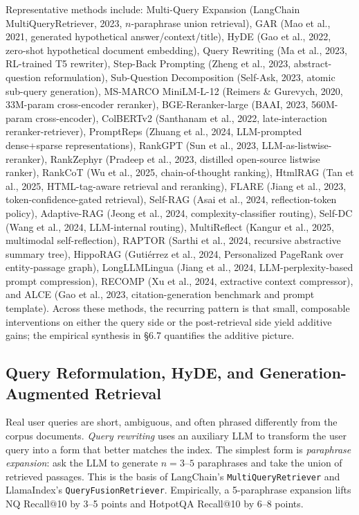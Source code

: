 Representative methods include: Multi-Query Expansion (LangChain MultiQueryRetriever, 2023, \(n\)-paraphrase union retrieval), GAR (Mao et al., 2021, generated hypothetical answer/context/title), HyDE (Gao et al., 2022, zero-shot hypothetical document embedding), Query Rewriting (Ma et al., 2023, RL-trained T5 rewriter), Step-Back Prompting (Zheng et al., 2023, abstract-question reformulation), Sub-Question Decomposition (Self-Ask, 2023, atomic sub-query generation), MS-MARCO MiniLM-L-12 (Reimers \& Gurevych, 2020, 33M-param cross-encoder reranker), BGE-Reranker-large (BAAI, 2023, 560M-param cross-encoder), ColBERTv2 (Santhanam et al., 2022, late-interaction reranker-retriever), PromptReps (Zhuang et al., 2024, LLM-prompted dense+sparse representations), RankGPT (Sun et al., 2023, LLM-as-listwise-reranker), RankZephyr (Pradeep et al., 2023, distilled open-source listwise ranker), RankCoT (Wu et al., 2025, chain-of-thought ranking), HtmlRAG (Tan et al., 2025, HTML-tag-aware retrieval and reranking), FLARE (Jiang et al., 2023, token-confidence-gated retrieval), Self-RAG (Asai et al., 2024, reflection-token policy), Adaptive-RAG (Jeong et al., 2024, complexity-classifier routing), Self-DC (Wang et al., 2024, LLM-internal routing), MultiReflect (Kangur et al., 2025, multimodal self-reflection), RAPTOR (Sarthi et al., 2024, recursive abstractive summary tree), HippoRAG (Gutiérrez et al., 2024, Personalized PageRank over entity-passage graph), LongLLMLingua (Jiang et al., 2024, LLM-perplexity-based prompt compression), RECOMP (Xu et al., 2024, extractive context compressor), and ALCE (Gao et al., 2023, citation-generation benchmark and prompt template). Across these methods, the recurring pattern is that small, composable interventions on either the query side or the post-retrieval side yield additive gains; the empirical synthesis in §6.7 quantifies the additive picture.

\subsection{Query Reformulation, HyDE, and Generation-Augmented Retrieval}\label{query-reformulation-hyde-and-generation-augmented-retrieval}

Real user queries are short, ambiguous, and often phrased differently from the corpus documents. \emph{Query rewriting} uses an auxiliary LLM to transform the user query into a form that better matches the index. The simplest form is \emph{paraphrase expansion}: ask the LLM to generate \(n=3\)--\(5\) paraphrases and take the union of retrieved passages. This is the basis of LangChain's \texttt{MultiQueryRetriever} and LlamaIndex's \texttt{QueryFusionRetriever}. Empirically, a 5-paraphrase expansion lifts NQ Recall@10 by 3--5 points and HotpotQA Recall@10 by 6--8 points.

